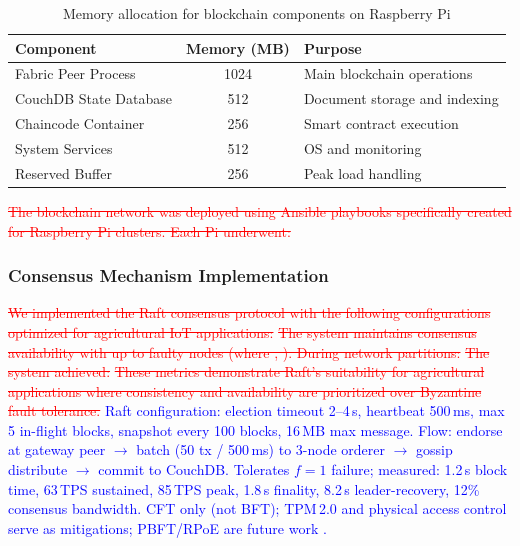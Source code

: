 \documentclass[pdflatex,sn-mathphys-num]{sn-jnl}
\theoremstyle{thmstyleone}
\theoremstyle{thmstyletwo}
\theoremstyle{thmstylethree}
\begin{document}
{\begin{table}[htbp]
\centering
\caption{Memory allocation for blockchain components on Raspberry Pi}
\label{tab:memory-allocation}
\scriptsize
\setlength{\tabcolsep}{3pt}
\begin{tabularx}{\columnwidth}{l c X}
\toprule
\textbf{Component} & \textbf{Memory (MB)} & \textbf{Purpose} \\
\midrule
Fabric Peer Process       & 1024 & Main blockchain operations \\
CouchDB State Database    & 512  & Document storage and indexing \\
Chaincode Container       & 256  & Smart contract execution \\
System Services           & 512  & OS and monitoring \\
Reserved Buffer           & 256  & Peak load handling \\
\bottomrule
\end{tabularx}
\end{table}

\textcolor{red}{\sout{The blockchain network was deployed using Ansible playbooks specifically created for Raspberry Pi clusters. Each Pi underwent:}}
\subsubsection{Consensus Mechanism Implementation}
\label{subsubsec:consensus_details}

\textcolor{red}{\sout{We implemented the Raft consensus protocol with the following configurations optimized for agricultural IoT applications:}}
\textcolor{red}{\sout{The system maintains consensus availability with up to faulty nodes (where , ). During network partitions:}}
\textcolor{red}{\sout{The system achieved:}}
\textcolor{red}{\sout{These metrics demonstrate Raft's suitability for agricultural applications where consistency and availability are prioritized over Byzantine fault tolerance.}}
\textcolor{blue}{Raft configuration: election timeout 2–4\,s, heartbeat 500\,ms, max 5 in-flight blocks, snapshot every 100 blocks, 16\,MB max message. Flow: endorse at gateway peer $\to$ batch (50 tx / 500\,ms) to 3-node orderer $\to$ gossip distribute $\to$ commit to CouchDB. Tolerates $f=1$ failure; measured: 1.2\,s block time, 63\,TPS sustained, 85\,TPS peak, 1.8\,s finality, 8.2\,s leader-recovery, 12\% consensus bandwidth. CFT only (not BFT); TPM\,2.0 and physical access control serve as mitigations; PBFT/RPoE are future work \cite{rbcet2025,rpoe2026,abishu2021consensus}.}

}
\end{document}
